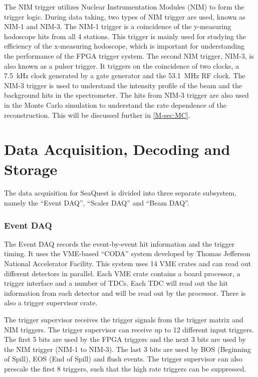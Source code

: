 \documentclass[../main.tex]{subfiles}
\begin{document}
The NIM trigger utilizes Nuclear Instrumentation Modules (NIM) to form the trigger
logic. During data taking, two types of NIM trigger are used, known as NIM-1
and NIM-3. The NIM-1 trigger is a coincidence of the y-measuring hodoscope hits
from all 4 stations. This trigger is mainly used for studying the efficiency
of the x-measuring hodoscope, which is important for understanding the performance
of the FPGA trigger system. The second NIM trigger, NIM-3, is also known as a
pulser trigger. It triggers on the coincidence of two clocks, a \SI{7.5}{\kHz}
clock generated by a gate generator and the \SI{53.1}{\MHz}
RF clock. The NIM-3 trigger is used to understand the intensity profile of the
beam and the background hits in the spectrometer. The hits from NIM-3 trigger
are also used in the Monte Carlo simulation to understand the rate dependence
of the reconstruction. This will be discussed further in \cref{M-sec:MC}.

\section{Data Acquisition, Decoding and Storage}
The data acquisition for SeaQuest is divided into three separate subsystem, namely
the ``Event DAQ'', ``Scaler DAQ'' and ``Beam DAQ''.

\subsubsection{Event DAQ}
The Event DAQ records the event-by-event hit information and the trigger timing.
It uses the VME-based ``CODA'' \cite{CODA} system developed by Thomas Jefferson National Accelerator
Facility. This system uses 14 VME crates and can read out different detectors in parallel.
Each VME crate contains a board processor, a trigger interface and a number of TDCs.
Each TDC will read out the hit information from each detector and will be read out by the processor.
There is also a trigger supervisor crate.

The trigger supervisor receives the trigger signals from the trigger matrix and NIM triggers. The trigger supervisor
can receive up to 12 different input triggers. The first 5 bits are used by the FPGA triggers
and the next 3 bits are used by the NIM trigger (NIM-1 to NIM-3). The last 3 bits
are used by BOS (Beginning of Spill), EOS (End of Spill) and flush events.
The trigger supervisor can also prescale the first 8 triggers, such that the high rate triggers can be suppressed.
\end{document}
